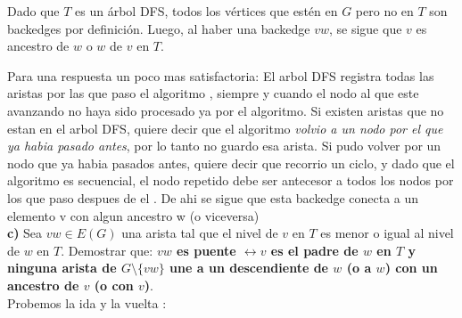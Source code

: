 \documentclass{article}
\begin{document}
Dado que $T$ es un árbol DFS, todos los vértices que estén en $G$ pero no en $T$ son backedges por definición. Luego, al haber una backedge $vw$, se sigue que $v$ es ancestro de $w$ o $w$ de $v$ en $T$.\\


\begin{center}

\end{center}

Para una respuesta un poco mas satisfactoria: El arbol DFS registra todas las aristas por las que paso el algoritmo , siempre y cuando el nodo al que este avanzando no haya sido procesado ya por el algoritmo. Si existen aristas que no estan en el arbol DFS, quiere decir que el algoritmo \textit{ volvio a un nodo por el que ya habia pasado antes}, por lo tanto no guardo esa arista. Si pudo volver por un nodo que ya habia pasados antes, quiere decir que recorrio un ciclo, y dado que el algoritmo es secuencial, el nodo repetido debe ser antecesor a todos los nodos por los que paso despues de el . De ahi se sigue que esta backedge conecta a un elemento v con algun ancestro w (o viceversa) \\


\textbf{c)}
Sea $vw \in E(G)$ una arista tal que el nivel de $v$ en $T$ es menor o igual al nivel de $w$ en $T$.
Demostrar que: \textbf{$vw$ es puente $\leftrightarrow v$ es el padre de $w$ en $T$ y ninguna arista de $G \setminus \{vw\}$ une a un descendiente de $w$ (o a $w$) con un ancestro de $v$ (o con $v$)}.\\

Probemos la ida y la vuelta :\\
\end{document}
